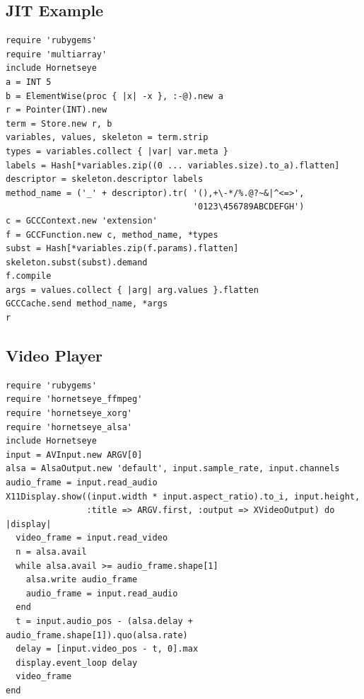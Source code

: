 \documentclass[12pt,a4paper,oneside,openright]{book}
\begin{document}
\begin{CJK}{UTF8}{}
\subsection{\acs{JIT} Example}\label{cha:jitsample}
\begin{lstlisting}
require 'rubygems'
require 'multiarray'
include Hornetseye
a = INT 5
b = ElementWise(proc { |x| -x }, :-@).new a
r = Pointer(INT).new
term = Store.new r, b
variables, values, skeleton = term.strip
types = variables.collect { |var| var.meta }
labels = Hash[*variables.zip((0 ... variables.size).to_a).flatten]
descriptor = skeleton.descriptor labels
method_name = ('_' + descriptor).tr( '(),+\-*/%.@?~&|^<=>',
                                     '0123\456789ABCDEFGH')
c = GCCContext.new 'extension'
f = GCCFunction.new c, method_name, *types
subst = Hash[*variables.zip(f.params).flatten]
skeleton.subst(subst).demand
f.compile
args = values.collect { |arg| arg.values }.flatten
GCCCache.send method_name, *args
r
\end{lstlisting}

\subsection{Video Player}\label{cha:player}
\begin{lstlisting}
require 'rubygems'
require 'hornetseye_ffmpeg'
require 'hornetseye_xorg'
require 'hornetseye_alsa'
include Hornetseye
input = AVInput.new ARGV[0]
alsa = AlsaOutput.new 'default', input.sample_rate, input.channels
audio_frame = input.read_audio
X11Display.show((input.width * input.aspect_ratio).to_i, input.height,
                :title => ARGV.first, :output => XVideoOutput) do |display|
  video_frame = input.read_video
  n = alsa.avail
  while alsa.avail >= audio_frame.shape[1]
    alsa.write audio_frame
    audio_frame = input.read_audio
  end
  t = input.audio_pos - (alsa.delay + audio_frame.shape[1]).quo(alsa.rate)
  delay = [input.video_pos - t, 0].max
  display.event_loop delay
  video_frame
end
\end{lstlisting}


\end{CJK}
\end{document}

